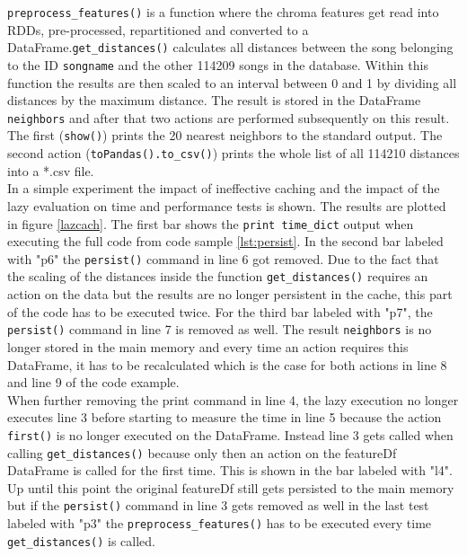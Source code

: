 \noindent \lstinline{preprocess_features()} is a function where the chroma features get read into RDDs, pre-processed, repartitioned and converted to a DataFrame.\lstinline{get_distances()} calculates all distances between the song belonging to the ID \lstinline{songname} and the other 114209 songs in the database. Within this function the results are then scaled to an interval between 0 and 1 by dividing all distances by the maximum distance. The result is stored in the DataFrame \lstinline{neighbors} and after that two actions are performed subsequently on this result. The first (\lstinline{show()}) prints the 20 nearest neighbors to the standard output. The second action (\lstinline{toPandas().to_csv()}) prints the whole list of all 114210 distances into a *.csv file.\\
In a simple experiment the impact of ineffective caching and the impact of the lazy evaluation on time and performance tests is shown. The results are plotted in figure \ref{lazcach}. The first bar shows the \lstinline{print time_dict} output when executing the full code from code sample \ref{lst:persist}. In the second bar labeled with "p6" the \lstinline{persist()} command in line 6 got removed. Due to the fact that the scaling of the distances inside the function \lstinline{get_distances()} requires an action on the data but the results are no longer persistent in the cache, this part of the code has to be executed twice. For the third bar labeled with "p7", the \lstinline{persist()} command in line 7 is removed as well. The result \lstinline{neighbors} is no longer stored in the main memory and every time an action requires this DataFrame, it has to be recalculated which is the case for both actions in line 8 and line 9 of the code example.\\
When further removing the print command in line 4, the lazy execution no longer executes line 3 before starting to measure the time in line 5 because the action \lstinline{first()} is no longer executed on the DataFrame. Instead line 3 gets called when calling \lstinline{get_distances()} because only then an action on the featureDf DataFrame is called for the first time. This is shown in the bar labeled with "l4". Up until this point the original featureDf still gets persisted to the main memory but if the \lstinline{persist()} command in line 3 gets removed as well in the last test labeled with "p3" the \lstinline{preprocess_features()} has to be executed every time \lstinline{get_distances()} is called.  

